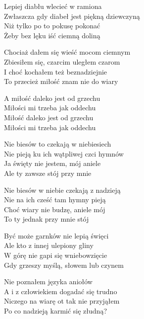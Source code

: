 \begin{text}
Lepiej diabłu wlecieć w ramiona\\
Zwłaszcza gdy diabeł jest piękną dziewczyną\\
Niż tylko po to pokusę pokonać\\
Żeby bez lęku iść ciemną doliną

Chociaż dałem się wieść mocom ciemnym\\
Zbiesiłem się, czarcim uległem czarom\\
I choć kochałem też beznadziejnie\\
To przecież miłość znam nie do wiary

\vin A miłość daleko jest od grzechu\\
\vin Miłości mi trzeba jak oddechu\\
\vin Miłość daleko jest od grzechu\\
\vin Miłości mi trzeba jak oddechu

\vin Nie biesów to czekają w niebiesiech\\
\vin Nie pieją ku ich wątpliwej czci hymnów\\
\vin Ja święty nie jestem, mój aniele\\
\vin Ale ty zawsze stój przy mnie

\vin Nie biesów w niebie czekają z nadzieją\\
\vin Nie na ich cześć tam hymny pieją\\
\vin Choć wiary nie budzę, aniele mój\\
\vin To ty jednak przy mnie stój

Być może garnków nie lepią święci\\
Ale kto z innej ulepiony gliny\\
W górę nie gapi się wniebowzięcie\\
Gdy grzeszy myślą, słowem lub czynem

Nie poznałem języka aniołów\\
A i z człowiekiem dogadać się trudno\\
Niczego na wiarę ot tak nie przyjąłem\\
Po co nadzieją karmić się złudną?
\end{text}

